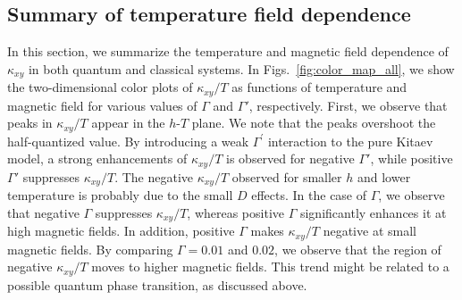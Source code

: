 \documentclass[twocolumn,superscriptaddress,showpacs, longbibliography, aps, prb]{revtex4-2}
\begin{document}

\subsection{Summary of temperature field dependence}
In this section, we summarize the temperature and %
magnetic field 
dependence of $\kappa_{xy}$ in both quantum and classical systems.
In Figs.~\ref{fig:color_map_all},
we %
show the two-dimensional color plots of $\kappa_{xy}/T$ %
as functions of temperature and %
magnetic field for various values of $\Gamma$ and $\Gamma'$, respectively. 
First, we %
observe that %
peaks in $\kappa_{xy}/T$ appear in the $h$-$T$ plane.
We note that the peaks %
overshoot the half-quantized value. 
By introducing a weak $\Gamma^{\prime}$ interaction to the pure Kitaev model, 
a strong enhancements of $\kappa_{xy}/T$ %
is observed for negative $\Gamma'$, while positive $\Gamma'$ suppresses $\kappa_{xy}/T$. 
The negative $\kappa_{xy}/T$ observed for smaller $h$ and lower temperature %
is probably due to the small $D$ effects.
In the case of $\Gamma$,
we %
observe that negative $\Gamma$ suppresses $\kappa_{xy}/T$, 
whereas positive $\Gamma$ %
significantly enhances it %
at high magnetic fields. 
In addition, positive $\Gamma$ %
makes $\kappa_{xy}/T$ negative at small magnetic fields. 
By comparing $\Gamma = 0.01$ and $0.02$, we %
observe that the region of negative $\kappa_{xy}/T$ moves to higher magnetic fields. This trend might be related to a possible quantum phase transition, as discussed above. 
\end{document}
